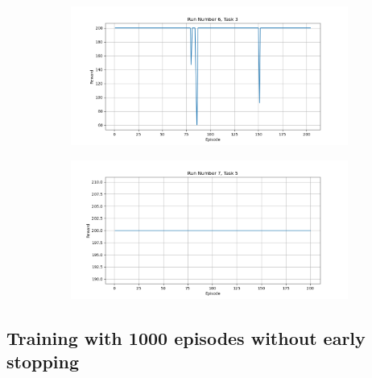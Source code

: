 \documentclass[runningheads]{llncs}
\begin{document}
\begin{figure}[H]
\begin{subfigure}{.45\textwidth}
     \end{subfigure}
      \begin{subfigure}{.45\textwidth}
          \centering
          \includegraphics[width=1\textwidth] {imgs/1000_episodes/Task_3_run_6}
      \end{subfigure}
      \begin{subfigure}{.45\textwidth}
          \centering
          \includegraphics[width=1\textwidth] {imgs/1000_episodes/Task_5_run_7}
      \end{subfigure}
 \end{figure}

\newpage

\subsection{Training with 1000 episodes without early stopping}
\end{document}
